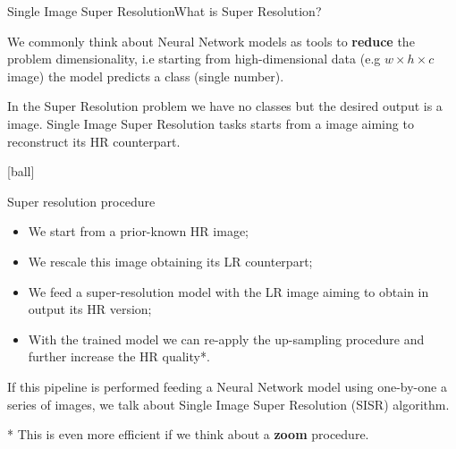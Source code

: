 \documentclass[10pt, technote, oribibl, unicode]{beamer}
\begin{document}
\begin{frame}{Single Image Super Resolution}{What is Super Resolution?}


  \scriptsize{We commonly think about Neural Network models as tools to \textbf{reduce} the problem dimensionality, i.e starting from high-dimensional data (e.g $w\times h\times c$ image) the model predicts a class (single number)}.

  \scriptsize{In the Super Resolution problem we have no classes but the desired output is a image.}
  \scriptsize{Single Image Super Resolution tasks starts from a image aiming to reconstruct its HR counterpart.}

  [ball]

  \begin{exampleblock}{Super resolution procedure}
    \begin{itemize}

      \item We start from a prior-known HR image;
      \item We rescale this image obtaining its LR counterpart;
      \item We feed a super-resolution model with the LR image aiming to obtain in output its HR version;
      \item With the trained model we can re-apply the up-sampling procedure and further increase the HR quality*.

    \end{itemize}
  \end{exampleblock}

  \scriptsize{If this pipeline is performed feeding a Neural Network model using one-by-one a series of images, we talk about Single Image Super Resolution (SISR) algorithm.}

  \vspace{0.5cm}
  \scriptsize{* This is even more efficient if we think about a \textbf{zoom} procedure.}

\end{frame}
\end{document}
